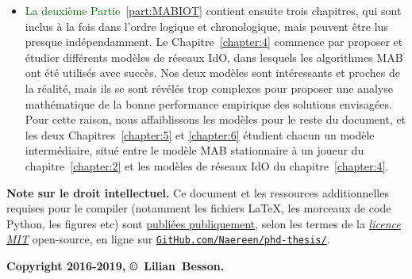 \begin{resume_fr}
\begin{itemize}
    \item
\textcolor{darkgreen}{La deuxième Partie~\ref{part:MABIOT}} contient ensuite trois chapitres, qui sont inclus à la fois dans l'ordre logique et chronologique, mais peuvent être lus presque indépendamment.
Le Chapitre~\ref{chapter:4} commence par proposer et étudier différents modèles de réseaux IdO, dans lesquels les algorithmes MAB ont été utilisés avec succès. Nos deux modèles sont intéressants et proches de la réalité, mais ils se sont révélés trop complexes pour proposer une analyse mathématique de la bonne performance empirique des solutions envisagées.
Pour cette raison, nous affaiblissons les modèles pour le reste du document,
et les deux Chapitres~\ref{chapter:5} et \ref{chapter:6} étudient chacun un modèle intermédiaire, situé entre le modèle MAB stationnaire à un joueur du chapitre~\ref{chapter:2} et les modèles de réseaux IdO du chapitre~\ref{chapter:4}.
\end{itemize}


\vfill{}

\textbf{Note sur le droit intellectuel.}
%
Ce document et les ressources additionnelles requises pour le compiler (notamment les fichiers \LaTeX, les morceaux de code Python, les figures etc)
sont \href{https://github.com/Naereen/phd-thesis/}{publiées publiquement},
selon les termes de la \href{https://lbesson.mit-license.org/}{\emph{licence MIT}} open-source,
en ligne sur \href{https://github.com/Naereen/phd-thesis/}{\texttt{GitHub.com/Naereen/phd-thesis/}}.


\begin{center}
    \textbf{Copyright 2016-2019, \copyright ~Lilian~Besson.}
\end{center}


\end{resume_fr}
